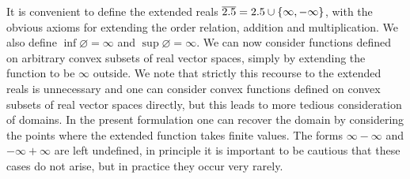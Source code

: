 It is convenient to define the extended reals $\overline{2.5} = 2.5 \cup \{\infty, -\infty\}$, with the obvious axioms for extending the order relation, addition and multiplication. We also define $\inf\varnothing = \infty$ and $\sup\varnothing = \infty$.
We can now consider functions defined on arbitrary convex subsets of real vector spaces, simply by extending the function to be $\infty$ outside. We note that strictly this recourse to the extended reals is unnecessary and one can consider convex functions defined on convex subsets of real vector spaces directly, but this leads to more tedious consideration of domains. In the present formulation one can recover the domain by considering the points where the extended function takes finite values. The forms $\infty-\infty$ and $-\infty +\infty$ are left undefined, in principle it is important to be cautious that these cases do not arise, but in practice they occur very rarely.


